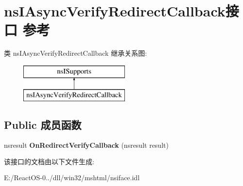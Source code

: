 \hypertarget{interfacens_i_async_verify_redirect_callback}{}\section{ns\+I\+Async\+Verify\+Redirect\+Callback接口 参考}
\label{interfacens_i_async_verify_redirect_callback}
类 ns\+I\+Async\+Verify\+Redirect\+Callback 继承关系图\+:\begin{figure}[H]
\begin{center}
\leavevmode
\includegraphics[height=2.000000cm]{interfacens_i_async_verify_redirect_callback}
\end{center}
\end{figure}
\subsection*{Public 成员函数}
\begin{DoxyCompactItemize}
\item 
\mbox{\label{interfacens_i_async_verify_redirect_callback_a8c12d1bc250cfa3c5bd302d3904067e9}} 
nsresult {\bfseries On\+Redirect\+Verify\+Callback} (nsresult result)
\end{DoxyCompactItemize}


该接口的文档由以下文件生成\+:\begin{DoxyCompactItemize}
\item 
E\+:/\+React\+O\+S-\/0../dll/win32/mshtml/nsiface.\+idl\end{DoxyCompactItemize}
